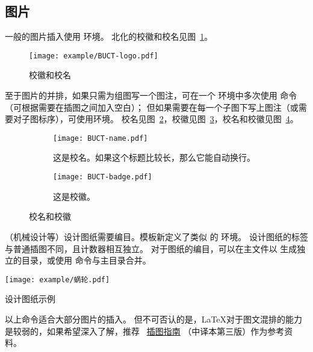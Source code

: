 \subsection{图片}\label{subsec:fig}
一般的图片插入使用  环境。
北化的校徽和校名见图~\ref{fig:WholeLogo}。

\begin{figure}[H]
	\centering
	\texttt{[image: example/BUCT-logo.pdf]}
	\caption{校徽和校名}\label{fig:WholeLogo}
\end{figure}

至于图片的并排，如果只需为组图写一个图注，可在一个  环境中多次使用  命令（可根据需要在插图之间加入空白）；
但如果需要在每一个子图下写上图注（或需要对子图标序），可使用环境。
校名见图~\ref{subfig:znname}，校徽见图~\ref{subfig:logo}，校名和校徽见图~\ref{fig:wholelogo}。
\begin{figure}[H]
	\centering%
	\begin{subfigure}[t]{6cm}
		\texttt{[image: BUCT-name.pdf]}
		\caption{这是校名。如果这个标题比较长，那么它能自动换行。}\label{subfig:znname}
	\end{subfigure}
	\hspace{1cm}
	\begin{subfigure}[t]{2.5cm}
		\texttt{[image: BUCT-badge.pdf]}
		\caption{这是校徽。}\label{subfig:logo}
	\end{subfigure}
	\caption{校名和校徽}\label{fig:wholelogo}
\end{figure}

（机械设计等）设计图纸需要编目。模板新定义了类似  的 环境。
设计图纸的标签与普通插图不同，且计数器相互独立。
对于图纸的编目，可以在主文件以  生成独立的目录，或使用
命令与主目录合并。
\begin{dfigure}%
	\centering
	\texttt{[image: example/蜗轮.pdf]}
	\caption{设计图纸示例}%
\end{dfigure}

以上命令适合大部分图片的插入。
但不可否认的是，\LaTeX{}对于图文混排的能力是较弱的，如果希望深入了解，推荐~
\href{https://github.com/WenboSheng/epslatex-cn}{\LaTeXe 插图指南}
（中译本第三版）作为参考资料。



